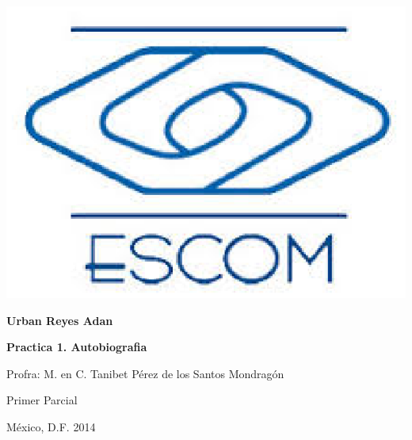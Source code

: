 \begin{minipage}{0.20\textwidth}
	\includegraphics[width=1\textwidth]{portada/escom.eps}

\end{minipage}%

\vspace{3cm}
\centerline{\Large \bf Urban Reyes Adan}


\vspace{2cm}
\centerline{\Large  \bf Practica 1. Autobiografia }

\vspace{2cm}

\centerline{\Large Profra: M. en C. Tanibet Pérez de los Santos Mondragón }
\vspace{1.5cm}
\centerline{\Large  Primer Parcial }

 
\vspace{3cm}
{\large  M\'{e}xico, D.F. \hfill 2014}

